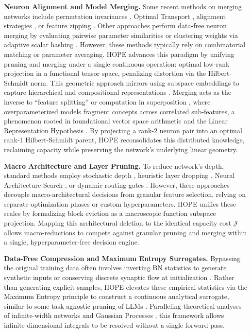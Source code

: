 \documentclass[11pt, a4paper, copyright, gdm]{google}
\newcommand{\calJ}{\mathcal{J}}
\theoremstyle{definition}
\begin{document}
\noindent \textbf{Neuron Alignment and Model Merging.} Some recent methods on merging networks include permutation invariances \cite{entezari2021role, ainsworth2022git}, Optimal Transport \cite{singh2020model}, alignment strategies \cite{tatro2020optimizing}, or feature zipping \cite{stoica2023zipit}. Other approaches perform data-free neuron merging by evaluating pairwise parameter similarities \cite{SrinivasBabu2015} or clustering weights via adaptive scalar hashing \cite{Yvinecetal2021}. However, these methods typically rely on combinatorial matching or parameter averaging. HOPE advances this paradigm by unifying pruning and merging under a single continuous operation: optimal low-rank projection in a functional tensor space, penalizing distortion via the Hilbert-Schmidt norm. This geometric approach mirrors using subspace embeddings to capture hierarchical and compositional representations \cite{Moreira2025}. Merging acts as the inverse to ``feature splitting'' \cite{bricken2023towards} or computation in superposition \cite{Hanni2024}, where overparameterized models fragment concepts across correlated sub-features, a phenomenon rooted in foundational vector space arithmetic \cite{mikolov2013efficient, pennington2014glove} and the Linear Representation Hypothesis \cite{park2023linear, engels2024notall}. By projecting a rank-2 neuron pair into an optimal rank-1 Hilbert-Schmidt parent, HOPE reconsolidates this distributed knowledge, reclaiming capacity while preserving the network's underlying linear geometry.


\noindent \textbf{Macro Architecture and Layer Pruning.} To reduce network's depth, standard methods employ stochastic depth \cite{huang2016deep}, heuristic layer dropping \cite{fan2019reducing}, Neural Architecture Search \cite{zoph2016neural, liu2018darts}, or dynamic routing gates \cite{veit2018convolutional, wang2018skipnet}. However, these approaches decouple macro-architectural decisions from granular feature selection, relying on separate optimization phases or custom hyperparameters. HOPE unifies these scales by formalizing block eviction as a macroscopic function subspace projection. Mapping this architectural deletion to the identical capacity cost $\calJ$ allows macro-reductions to compete against granular pruning and merging within a single, hyperparameter-free decision engine.

\noindent \textbf{Data-Free Compression and Maximum Entropy Surrogates.} Bypassing the original training data often involves inverting BN statistics to generate synthetic inputs \cite{lopes2017data, cai2020zeroq, nagel2019data, micaelli2019zero, yin2020dreaming} or conserving discrete synaptic flow at initialization \cite{Tanaka2020PruningNN}. Rather than generating explicit samples, HOPE elevates these empirical statistics via the Maximum Entropy principle \cite{jaynes1957information} to construct a continuous analytical surrogate, similar to some task-agnostic pruning of LLMs \cite{Ma2023}. Paralleling theoretical analyses of infinite-width networks and Gaussian Processes \cite{neal1996bayesian, lee2018deep, jacot2018neural, yang2019tensor}, this framework allows infinite-dimensional integrals to be resolved without a single forward pass.
\end{document}
